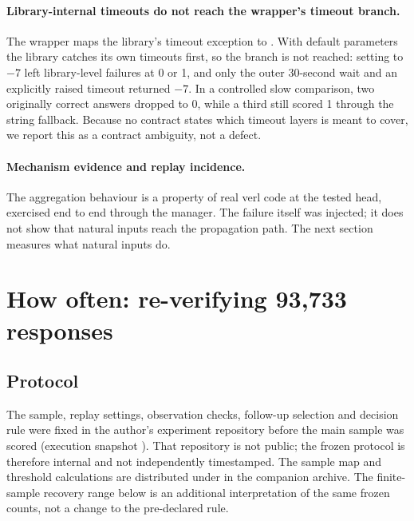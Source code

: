 \documentclass[11pt,a4paper]{article}
\begin{document}
\paragraph{Library-internal timeouts do not reach the wrapper's timeout branch.} The wrapper maps the library's timeout exception to . With default parameters the library catches its own timeouts first, so the branch is not reached: setting  to $-7$ left library-level failures at 0 or 1, and only the outer 30-second wait and an explicitly raised timeout returned $-7$. In a controlled slow comparison, two originally correct answers dropped to 0, while a third still scored 1 through the string fallback. Because no contract states which timeout layers  is meant to cover, we report this as a contract ambiguity, not a defect.

\paragraph{Mechanism evidence and replay incidence.} The aggregation behaviour is a property of real verl code at the tested head, exercised end to end through the manager. The failure itself was injected; it does not show that natural inputs reach the propagation path. The next section measures what natural inputs do.

\section{How often: re-verifying 93,733 responses}\label{sec:replay}
\subsection{Protocol}
The sample, replay settings, observation checks, follow-up selection and decision rule were fixed in the author's experiment repository before the main sample was scored (execution snapshot ). That repository is not public; the frozen protocol is therefore internal and not independently timestamped. The sample map and threshold calculations are distributed under  in the companion archive. The finite-sample recovery range below is an additional interpretation of the same frozen counts, not a change to the pre-declared rule.
\end{document}
